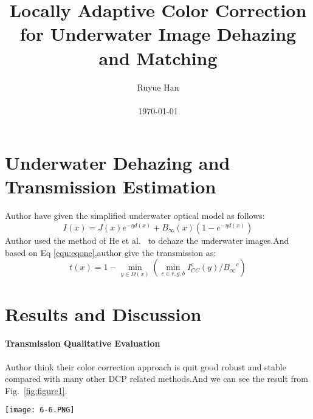 \documentclass[10pt,twocolumn,letterpaper]{article}
\begin{document}
\title{Locally Adaptive Color Correction for Underwater Image Dehazing and
Matching}

\author{Ruyue Han\\\\ \today}

\maketitle




\section{Underwater Dehazing and Transmission Estimation}
Author have given the simplified underwater optical model as follows:
\begin{equation}
I(x) = J(x)e^{-\eta d(x)}+B_{\infty}(x)(1-e^{-\eta d(x)}) \label{equ:eqone}
\end{equation}
Author used the method of He et al.~\cite{image2011_1} to dehaze the underwater images.And based on Eq \ref{equ:eqone},author give the transmission as:
\begin{equation}
t(x)=1- \min_{y\in{\Omega (x)}}  \left( \min_{c\in{r,g,b}}I^{c}_{CC}(y)/ {B_{\infty}}^{c}    \right)
\end{equation}


\section{Results and Discussion}
\paragraph{Transmission Qualitative Evaluation}
Author think their  color correction approach is quit good robust and stable compared with many other DCP related methods.And we can see the result from Fig.~\ref{fig:figure1}.
\begin{figure*}[h]
\centering
\texttt{[image: 6-6.PNG]}
\caption{Estimated transmission maps generated by different specialized underwater techniques (DCP [17], MDCP [13], UDCP [20]) and our approach generated with four different reference images.}
\label{fig:figure1}
\end{figure*}
\end{document}
